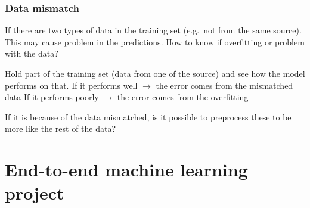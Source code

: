 \documentclass{article}
\begin{document}
\subsection{Data mismatch}
If there are two types of data in the training set (e.g.\ not from the same source).
This may cause problem in the predictions.
How to know if overfitting or problem with the data?

Hold part of the training set (data from one of the source) and see how the model performs on that.
If it performs well $\rightarrow$ the error comes from the mismatched data
If it performs poorly $\rightarrow$ the error comes from the overfitting

If it is because of the data mismatched, is it possible to preprocess these to be more like the rest of the data?



\chapter{End-to-end machine learning project}
\end{document}

